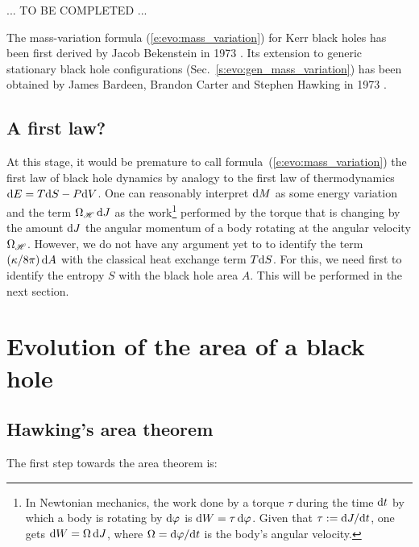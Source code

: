 ... TO BE COMPLETED ...


\begin{hist}
The mass-variation formula (\ref{e:evo:mass_variation}) for Kerr black holes
has been first
derived by Jacob Bekenstein
in 1973 \cite{Beken73a}. Its extension to generic stationary black hole configurations
(Sec.~\ref{s:evo:gen_mass_variation}) has been
obtained by James Bardeen, Brandon Carter
and Stephen Hawking in 1973 \cite{BardeCH73}.
\end{hist}



\subsection{A first law?}

At this stage, it would be premature to call formula~(\ref{e:evo:mass_variation})
the first law of black hole dynamics by analogy to the first law of thermodynamics
$\mathrm{d} E = T \mathrm{d} S - P \mathrm{d} V$. One can reasonably interpret $\mathrm{d} M$
as some energy variation and the term
$\Omega_{\mathscr{H}} \, \mathrm{d} J$ as the work\footnote{In Newtonian mechanics, the
work done by a torque $\tau$ during the time $\mathrm{d} t$ by which a body is rotating by $\mathrm{d}\varphi$
is $\mathrm{d} W = \tau \, \mathrm{d}\varphi$. Given that $\tau := \mathrm{d} J/\mathrm{d} t$, one gets $\mathrm{d} W = \Omega \, \mathrm{d} J$, where
$\Omega = \mathrm{d}\varphi/\mathrm{d} t$ is the body's angular velocity.} performed by the torque
that is changing by the amount $\mathrm{d} J$ the angular momentum of a body rotating
at the angular velocity $\Omega_{\mathscr{H}}$. However, we do not have any argument yet to
to identify the term $(\kappa/8\pi) \, \mathrm{d} A$ with the classical heat exchange term $T\mathrm{d} S$.
For this, we need first to identify the entropy $S$ with the black hole area $A$.
This will be performed in the next section.



\section{Evolution of the area of a black hole}

\subsection{Hawking's area theorem}

The first step towards the area theorem is:

